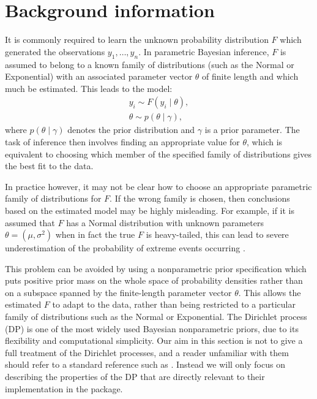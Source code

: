 \documentclass[nojss]{jss}
\begin{document}
\section{Background information}
\label{sec:background}


It is commonly required to learn the unknown probability distribution $F$ which generated the observations $y_1,\ldots,y_n$. In parametric Bayesian inference, $F$ is assumed to belong to a known family of distributions (such as the Normal or Exponential) with an associated parameter vector $\theta$ of finite length and which much be estimated. This leads to the model:
\begin{align*}
y_i \sim F(y_i \mid \theta), \\
\theta \sim p(\theta \mid \gamma),
\end{align*}
where $p(\theta \mid \gamma)$ denotes the prior distribution and $\gamma$ is a prior parameter. The task of inference then involves finding an appropriate value for $\theta$, which is equivalent to choosing which member of the specified family of distributions gives the best fit to the data.

In practice however, it may not be clear how to choose an appropriate parametric family of distributions for $F$. If the wrong family is chosen, then conclusions based on the estimated model may be highly misleading. For example, if it is assumed that $F$ has a Normal distribution with unknown parameters $\theta=(\mu,\sigma^2)$ when in fact the true $F$ is heavy-tailed, this can lead to severe underestimation of the probability of extreme events occurring \citep{coles_introduction_2001}.

This problem can be avoided by using a nonparametric prior specification which puts positive prior mass on the whole space of probability densities rather than on a subspace spanned by the finite-length parameter vector $\theta$. This allows the estimated $F$ to adapt to the data, rather than being restricted to a particular family of distributions such as the Normal or Exponential. The Dirichlet process (DP) is one of the most widely used Bayesian nonparametric priors, due to its flexibility and computational simplicity.  Our aim in this section is not to give a full treatment of the Dirichlet processes, and a reader unfamiliar with them should refer to a standard reference such as \cite{antoniak_mixtures_1974}. Instead we will only focus on describing the properties of the DP that are directly relevant to their implementation in the  package.
\end{document}
